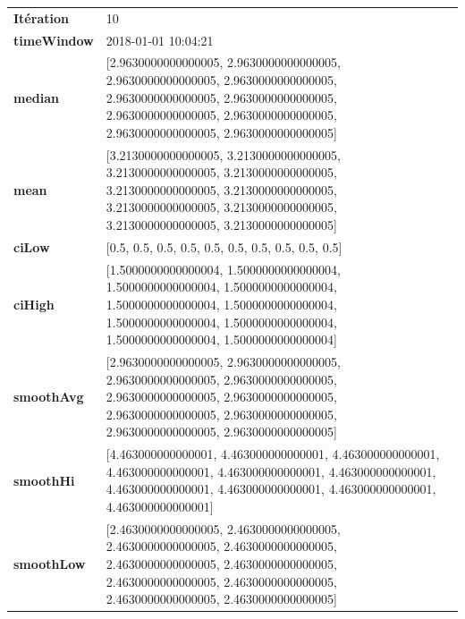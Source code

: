 \begin{table}[H]
	\centering
	\begin{tabularx}{\textwidth}{lX}
		\textbf{Itération}& 10 \\
		\textbf{timeWindow}	 &  2018-01-01 10:04:21  \\
		\textbf{median} & [2.9630000000000005, 2.9630000000000005, 2.9630000000000005, 2.9630000000000005, 2.9630000000000005, 2.9630000000000005, 2.9630000000000005, 2.9630000000000005, 2.9630000000000005, 2.9630000000000005] 
		\\ 
		\textbf{mean} & [3.2130000000000005, 3.2130000000000005, 3.2130000000000005, 3.2130000000000005, 3.2130000000000005, 3.2130000000000005, 3.2130000000000005, 3.2130000000000005, 3.2130000000000005, 3.2130000000000005] 
		\\
		\textbf{ciLow} & [0.5, 0.5, 0.5, 0.5, 0.5, 0.5, 0.5, 0.5, 0.5, 0.5]  \\
		\textbf{ciHigh}& [1.5000000000000004, 1.5000000000000004, 1.5000000000000004, 1.5000000000000004, 1.5000000000000004, 1.5000000000000004, 1.5000000000000004, 1.5000000000000004, 1.5000000000000004, 1.5000000000000004] 
		\\
		\textbf{smoothAvg} & [2.9630000000000005, 2.9630000000000005, 2.9630000000000005, 2.9630000000000005, 2.9630000000000005, 2.9630000000000005, 2.9630000000000005, 2.9630000000000005, 2.9630000000000005, 2.9630000000000005] 
		\\
		\textbf{smoothHi} & [4.463000000000001, 4.463000000000001, 4.463000000000001, 4.463000000000001, 4.463000000000001, 4.463000000000001, 4.463000000000001, 4.463000000000001, 4.463000000000001, 4.463000000000001] 
		\\
		\textbf{smoothLow} & [2.4630000000000005, 2.4630000000000005, 2.4630000000000005, 2.4630000000000005, 2.4630000000000005, 2.4630000000000005, 2.4630000000000005, 2.4630000000000005, 2.4630000000000005, 2.4630000000000005]
		\\ 
	\end{tabularx} 
\end{table}


